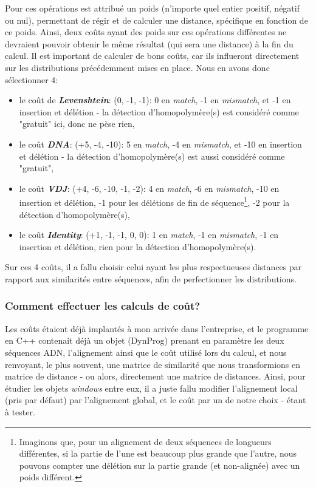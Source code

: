 \documentclass[12pt]{report}
\begin{document}
\begin{spacing}{1.2}
Pour ces opérations est attribué un poids (n'importe quel entier positif, négatif ou nul), permettant de régir et de calculer une distance, spécifique en fonction de ce poids.
\newline
Ainsi, deux coûts ayant des poids sur ces opérations différentes ne devraient pouvoir obtenir le même résultat (qui sera une distance) à la fin du calcul.
\newline
Il est important de calculer de bons coûts, car ils influeront directement sur les distributions précédemment mises en place. Nous en avons donc sélectionner 4:
\begin{itemize}
\item{le coût de \textbf{\textit{Levenshtein}}: (0, -1, -1): 0 en \textit{match}, -1 en \textit{mismatch}, et -1 en insertion et délétion - la détection d'homopolymère(s) est considéré comme "gratuit" ici, donc ne pèse rien,}
\item{le coût \textbf{\textit{DNA}}: (+5, -4, -10): 5 en \textit{match}, -4 en \textit{mismatch}, et -10 en insertion et délétion - la détection d'homopolymère(s) est aussi considéré comme "gratuit",}
\item{le coût \textbf{\textit{VDJ}}: (+4, -6, -10, -1, -2): 4 en \textit{match}, -6 en \textit{mismatch}, -10 en insertion et délétion, -1 pour les délétions de fin de séquence\footnote{Imaginons que, pour un alignement de deux séquences de longueurs différentes, si la partie de l'une est beaucoup plus grande que l'autre, nous pouvons compter une délétion sur la partie grande (et non-alignée) avec un poids différent.}, -2 pour la détection d'homopolymère(s),}
\item{le coût \textbf{\textit{Identity}}: (+1, -1, -1, 0, 0): 1 en \textit{match}, -1 en \textit{mismatch}, -1 en insertion et délétion, rien pour la détection d'homopolymère(s).}
\end{itemize}
Sur ces 4 coûts, il a fallu choisir celui ayant les plus respectueuses distances par rapport aux similarités entre séquences, afin de perfectionner les distributions.

\subsubsection{Comment effectuer les calculs de coût?}

Les coûts étaient déjà implantés à mon arrivée dans l'entreprise, et le programme en C++ contenait déjà un objet (DynProg) prenant en paramètre les deux séquences ADN, l'alignement ainsi que le coût utilisé lors du calcul, et nous renvoyant, le plus souvent, une matrice de similarité que nous transformions en matrice de distance - ou alors, directement une matrice de distances.
\newline
Ainsi, pour étudier les objets \textit{windows} entre eux, il a juste fallu modifier l'alignement local (pris par défaut) par l'alignement global, et le coût par un de notre choix - étant à tester.


\end{spacing}
\end{document}
